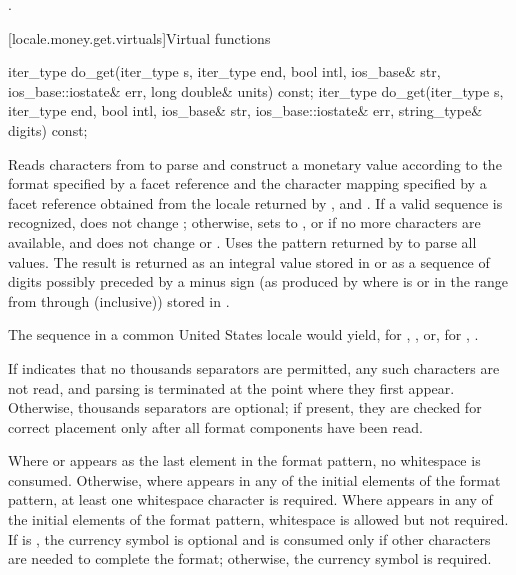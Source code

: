 \begin{itemdescr}
\pnum
\returns
{}.
\end{itemdescr}

[locale.money.get.virtuals]{Virtual functions}

%
\begin{itemdecl}
iter_type do_get(iter_type s, iter_type end, bool intl, ios_base& str,
                 ios_base::iostate& err, long double& units) const;
iter_type do_get(iter_type s, iter_type end, bool intl, ios_base& str,
                 ios_base::iostate& err, string_type& digits) const;
\end{itemdecl}

\begin{itemdescr}
\pnum
\effects
Reads characters from  to parse and construct a monetary value
according to the format specified by
a  facet reference 
and the character mapping specified by
a  facet reference 
obtained from the locale returned by , and
.
If a valid sequence is recognized, does not change ;
otherwise, sets  to , or
 if no more characters are available,
and does not change  or .
Uses the pattern returned by  to parse all values.
The result is returned as an integral value stored in 
or as a sequence of digits possibly preceded by a minus sign
(as produced by 
where  is  or
in the range from  through  (inclusive))
stored in .
\begin{example}
The sequence  in a common United States locale would yield,
for , , or,
for , .
\end{example}
If  indicates that no thousands separators are permitted,
any such characters are not read, and
parsing is terminated at the point where they first appear.
Otherwise, thousands separators are optional;
if present, they are checked for correct placement only after
all format components have been read.

\pnum
Where  or 
appears as the last element in the format pattern,
no whitespace is consumed.
Otherwise, where  appears in any of
the initial elements of the format pattern,
at least one whitespace character is required.
Where  appears
in any of the initial elements of the format pattern,
whitespace is allowed but not required.
If  is ,
the currency symbol is optional and
is consumed only if other characters are needed to complete the format;
otherwise, the currency symbol is required.


\end{itemdescr}
